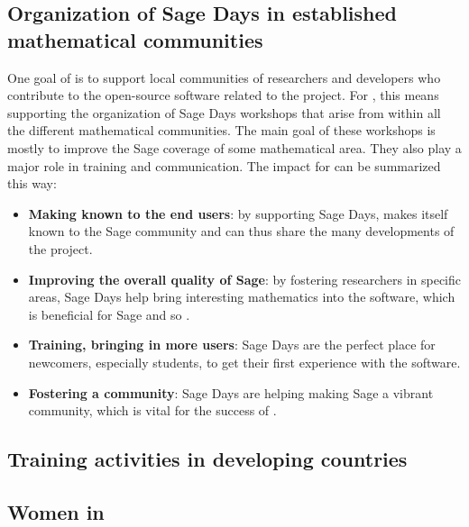 \documentclass{deliverablereport}
\begin{document}




\subsection{Organization of Sage Days in established mathematical communities}

One goal of \ODK is to support local communities of researchers
and developers who contribute to the open-source software related to
the project. For \Sage, this means supporting the organization of Sage Days
workshops that arise from within all the different mathematical communities. The main 
goal of these workshops is mostly to improve the Sage coverage of some mathematical
area. They also play a major role in training and communication. The
impact for \ODK can be summarized this way:

\begin{itemize}
\item \textbf{Making \ODK known to the end users}: by supporting Sage Days,
\ODK makes itself known to the Sage community and can
thus share the many developments of the project.

\item \textbf{Improving the overall quality of Sage}: by fostering researchers
in specific areas, Sage Days help bring interesting mathematics into
the software, which is beneficial for Sage and so \ODK.

\item \textbf{Training, bringing in more users}: Sage Days are the perfect place
for newcomers, especially students, to get their first experience with the software.

\item \textbf{Fostering a community}: Sage Days are helping making Sage a vibrant
community, which is vital for the success of \ODK.
\end{itemize}



\subsection{Training activities in developing countries}



\subsection{Women in \ODK}
\end{document}

